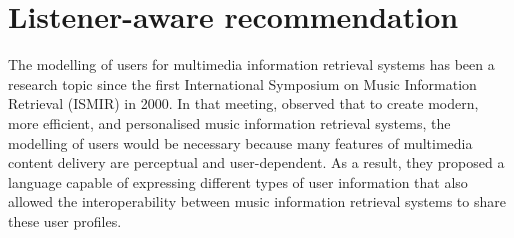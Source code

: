 \chapter{Listener-aware recommendation}\label{ch:6-listener-aware-music-recommendation}
\graphicspath{{./figs/ch8/}}
The modelling of users for multimedia information retrieval systems has been a research topic since the first International Symposium on Music Information Retrieval (ISMIR) in 2000. 
In that meeting, \textcite{chai00using} observed that to create modern, more efficient, and personalised music information retrieval systems, the modelling of users would be necessary because many features of multimedia content delivery are perceptual and user-dependent. 
As a result, they proposed a language capable of expressing different types of user information that also allowed the interoperability between music information retrieval systems to share these user profiles.


